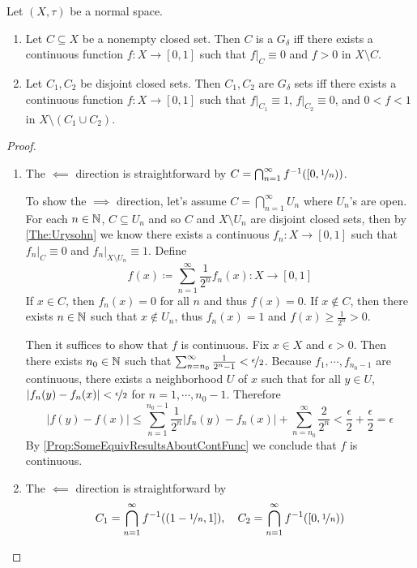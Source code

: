 \documentclass[screen]{techreport}
\numberwithin{equation}{section}
\begin{document}
\begin{proposition}\label{Prop:GdeltaStrongerSeparation}
	Let $(X,\tau)$ be a normal space.
	\begin{enumerate}
		\item Let $C \subseteq X$ be a nonempty closed set.
		Then $C$ is a $G_\delta$ iff there exists a continuous function $f : X \to [0,1]$ such that $f|_C \equiv 0$ and $f > 0$ in $X \setminus C$.
		\item Let $C_1,C_2$ be disjoint closed sets.
		Then $C_1,C_2$ are $G_\delta$ sets iff there exists a continuous function $f: X \to [0,1]$ such that $f|_{C_1} \equiv 1$, $f|_{C_2} \equiv 0$, and $0 < f < 1$ in $X \setminus (C_1 \cup C_2)$.
	\end{enumerate}
\end{proposition}
\begin{proof}\
	\begin{enumerate}
		\item  The $\impliedby$ direction is straightforward by $C = \bigcap_{n=1}^\infty f^{-1}([0,\nicefrac{1}{n}))$.
		
		To show the $\implies$ direction, let's assume $C = \bigcap_{n=1}^\infty U_n$ where $U_n$'s are open.
		For each $n \in \mathbb{N}$, $C \subseteq U_n$ and so $C$ and $X \setminus U_n$ are disjoint closed sets, then by \cref{The:Urysohn} we know there exists a continuous $f_n : X \to [0,1]$ such that $f_n|_C \equiv 0$ and $f_n|_{X \setminus U_n} \equiv 1$.
		Define
		\[
		f(x) \coloneqq \sum_{n=1}^\infty \frac{1}{2^n} f_n(x) : X \to [0,1]
		\]
		If $x \in C$, then $f_n(x) = 0$ for all $n$ and thus $f(x) = 0$.
		If $x \not\in C$, then there exists $n \in \mathbb{N}$ such that $x \not\in U_n$, thus $f_n(x) = 1$ and $f(x) \ge \frac{1}{2^n} > 0$.
		
		Then it suffices to show that $f$ is continuous.
		Fix $x \in X$ and $\epsilon > 0$.
		Then there exists $n_0 \in \mathbb{N}$ such that $\sum_{n=n_0}^\infty \frac{1}{2^n-1} < \nicefrac{\epsilon}{2}$.
		Because $f_1,\cdots,f_{n_0-1}$ are continuous, there exists a neighborhood $U$ of $x$ such that for all $y \in U$, $|f_n(y) - f_n(x)| < \nicefrac{\epsilon}{2}$ for $n=1,\cdots,n_0-1$.
		Therefore
		\[
			|f(y) - f(x)|  \le \sum_{n=1}^{n_0-1} \frac{1}{2^n} |f_n(y) - f_n(x)| + \sum_{n=n_0}^\infty \frac{2}{2^n} < \frac{\epsilon}{2} + \frac{\epsilon}{2} = \epsilon
		\]
		By \cref{Prop:SomeEquivResultsAboutContFunc} we conclude that $f$ is continuous.
		
		\item The $\impliedby$ direction is straightforward by
		\[
		C_1 = \bigcap_{n=1}^\infty f^{-1}((1-\nicefrac{1}{n},1]), \quad C_2 = \bigcap_{n=1}^\infty f^{-1}([0,\nicefrac{1}{n}))
		\]
		

\end{enumerate}
\end{proof}
\end{document}
